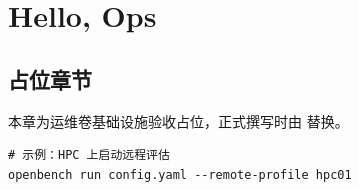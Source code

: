 \chapter{Hello, Ops}

\section{占位章节}

本章为运维卷基础设施验收占位，正式撰写时由  替换。


\begin{verbatim}
# 示例：HPC 上启动远程评估
openbench run config.yaml --remote-profile hpc01
\end{verbatim}
